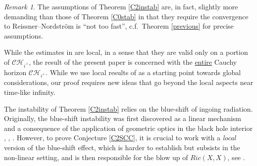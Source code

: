 \documentclass[10pt,a4paper]{article}
\theoremstyle{plain}
\theoremstyle{remark}
\newtheorem{rmk}{Remark}[section]
\theoremstyle{definition}
\theoremstyle{plain}
\theoremstyle{remark}
\theoremstyle{definition}
\newcommand{\CH}{\mathcal{CH}_{i^+}}
\numberwithin{equation}{section}
\begin{document}
\begin{rmk}
	The assumptions of Theorem \ref{C2instab} are, in fact, slightly more demanding than those of Theorem \ref{C0stab} in that they require the convergence to Reissner--Nordstr\"{o}m is ``not too fast'', c.f.\ Theorem \ref{previous} for precise assumptions.
\end{rmk}

While the estimates in \cite{Moi} are local, in a sense that they are valid only on a portion of $\CH$, the result of the present paper is concerned with the \underline{entire} Cauchy horizon $\CH$. While we use local results of \cite{Moi} as a starting point towards global considerations, our proof requires new ideas that go beyond the local aspects near time-like infinity. 

The instability of Theorem \ref{C2instab} relies on the blue-shift of ingoing radiation. Originally, the blue-shift instability was first discovered as a linear mechanism and a consequence of the application of geometric optics in the black hole interior \cite{McNamara}, \cite{Penroseblue}, \cite{JanGaussian}. However, to prove  Conjecture \ref{C2SCC}, it is crucial to work with a \textit{local} version of the blue-shift effect, which is harder to establish but subsists in the non-linear setting, and is then responsible for the blow up of $Ric(X,X)$, see \cite{Moi}. 
\end{document}
